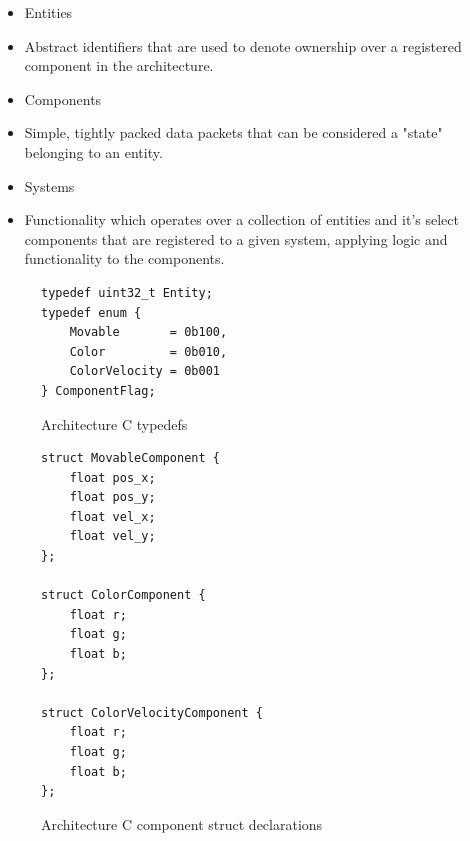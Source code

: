 \documentclass{article}
\begin{document}
\begin{itemize}
    \item Entities
    \item[] Abstract identifiers that are used to denote ownership over a
            registered component in the architecture.

    \item Components
    \item[] Simple, tightly packed data packets that can be considered a "state"
            belonging to an entity.

    \item Systems
    \item[] Functionality which operates over a collection of entities and it's
            select components that are registered to a given system, applying
            logic and functionality to the components.
\end{itemize}

\begin{figure}[h]
\centering
\begin{BVerbatim}
typedef uint32_t Entity;
typedef enum {
    Movable       = 0b100,
    Color         = 0b010,
    ColorVelocity = 0b001
} ComponentFlag;
\end{BVerbatim}
\caption{Architecture C typedefs}
\label{arch_c_typedefs}
\end{figure}

\begin{figure}
\centering
\begin{BVerbatim}
struct MovableComponent {
    float pos_x;
    float pos_y;
    float vel_x;
    float vel_y;
};

struct ColorComponent {
    float r;
    float g;
    float b;
};

struct ColorVelocityComponent {
    float r;
    float g;
    float b;
};
\end{BVerbatim}
\caption{Architecture C component struct declarations}
\label{arch_c_components_header}
\end{figure}
\end{document}
